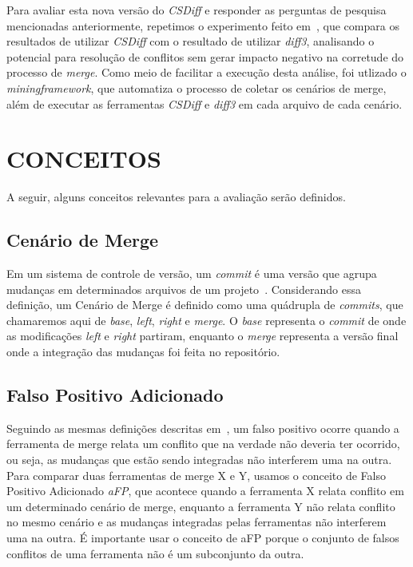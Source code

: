 Para avaliar esta nova versão do \emph{CSDiff} e responder as perguntas de pesquisa mencionadas anteriormente, repetimos
o experimento feito em~\cite{heitor21,clem21}, que compara os resultados de utilizar \emph{CSDiff} com o resultado
de utilizar \emph{diff3}, analisando o potencial para resolução de conflitos sem gerar impacto negativo na corretude do
processo de \emph{merge}. Como meio de facilitar a execução desta análise, foi utlizado o \emph{miningframework}, que
automatiza o processo de coletar os cenários de merge, além de executar as ferramentas \emph{CSDiff} e \emph{diff3} em
cada arquivo de cada cenário.

\section{CONCEITOS}\label{conceitos}
A seguir, alguns conceitos relevantes para a avaliação serão definidos.
\subsection{Cenário de Merge}
Em um sistema de controle de versão, um \emph{commit} é uma versão que agrupa mudanças em
determinados arquivos de um projeto~\cite{koc11}.
Considerando essa definição, um Cenário de Merge é definido como uma quádrupla de \emph{commits},
que chamaremos aqui de \emph{base},
\emph{left}, \emph{right} e \emph{merge}. O \emph{base} representa o \emph{commit} de onde as modificações \emph{left} e \emph{right}
partiram, enquanto o \emph{merge} representa a versão final onde a integração das mudanças foi feita no repositório.
\subsection{Falso Positivo Adicionado}
Seguindo as mesmas definições descritas em~\cite{clem21},
um falso positivo ocorre quando a ferramenta de merge relata um conflito
que na verdade não deveria ter ocorrido, ou seja, as
mudanças que estão sendo integradas
não interferem uma na outra. Para comparar duas ferramentas de merge
X e Y, usamos o conceito de Falso Positivo Adicionado \emph{aFP}, que acontece quando
a ferramenta X relata conflito em um determinado cenário de merge,
enquanto a ferramenta Y não relata conflito no mesmo cenário e
as mudanças integradas pelas ferramentas não interferem uma na outra.
É importante usar o conceito de aFP porque o conjunto de falsos conflitos
de uma ferramenta não é um subconjunto da outra.
